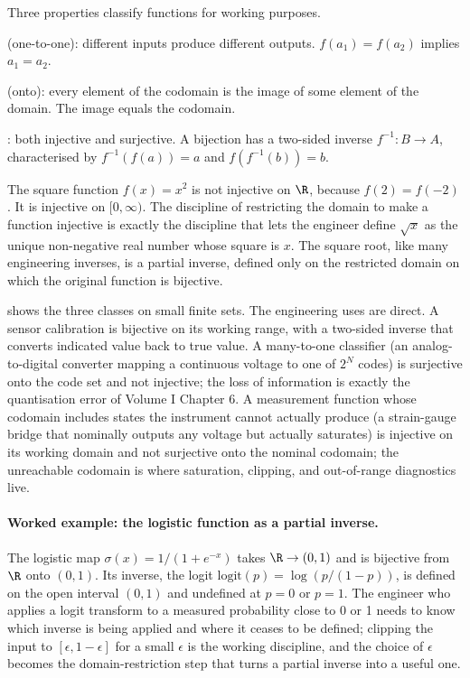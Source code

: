 Three properties classify functions for working purposes.

 (one-to-one): different inputs produce different
outputs. $f(a_{1}) = f(a_{2})$ implies $a_{1} = a_{2}$.

 (onto): every element of the codomain is the
image of some element of the domain. The image equals the codomain.

: both injective and surjective. A bijection has
a two-sided inverse $f^{-1} : B \to A$, characterised by $f^{-1}(f(a))
= a$ and $f(f^{-1}(b)) = b$.

The square function $f(x) = x^{2}$ is not injective on $\R$, because
$f(2) = f(-2)$. It is injective on $[0, \infty)$. The discipline of
restricting the domain to make a function injective is exactly the
discipline that lets the engineer define $\sqrt{x}$ as the unique
non-negative real number whose square is $x$. The square root, like
many engineering inverses, is a partial inverse, defined only on the
restricted domain on which the original function is bijective.



 shows the three classes on
small finite sets. The engineering uses are direct.
A sensor calibration is bijective on its working range, with a
two-sided inverse that converts indicated value back to true value.
A many-to-one classifier (an analog-to-digital converter mapping a
continuous voltage to one of $2^{N}$ codes) is surjective onto the
code set and not injective; the loss of information is exactly the
quantisation error of Volume I Chapter 6. A measurement function
whose codomain includes states the instrument cannot actually
produce (a strain-gauge bridge that nominally outputs any voltage
but actually saturates) is injective on its working domain and not
surjective onto the nominal codomain; the unreachable codomain is
where saturation, clipping, and out-of-range diagnostics live.

\paragraph{Worked example: the logistic function as a partial
inverse.} The logistic map $\sigma(x) = 1/(1 + e^{-x})$ takes
$\R \to (0, 1)$ and is bijective from $\R$ onto $(0, 1)$. Its
inverse, the logit $\text{logit}(p) = \log(p / (1 - p))$, is
defined on the open interval $(0, 1)$ and undefined at $p = 0$ or
$p = 1$. The engineer who applies a logit transform to a measured
probability close to 0 or 1 needs to know which inverse is being
applied and where it ceases to be defined; clipping the input to
$[\epsilon, 1 - \epsilon]$ for a small $\epsilon$ is the working
discipline, and the choice of $\epsilon$ becomes the
domain-restriction step that turns a partial inverse into a useful
one.

